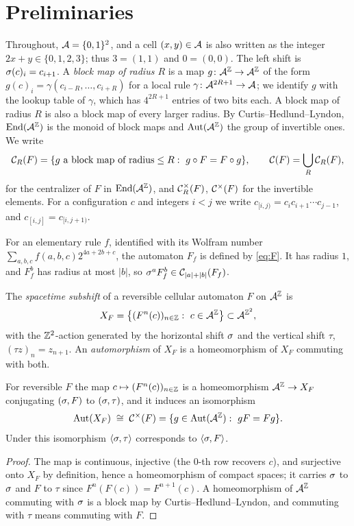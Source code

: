 \section{Preliminaries}\label{sec:prelim}

Throughout, $\mathcal{A}=\{0,1\}^2$, and a cell $(x,y)\in\mathcal{A}$ is also written as the integer $2x+y\in\{0,1,2,3\}$; thus $3=(1,1)$ and $0=(0,0)$. The left shift is $\sigma(c)_i=c_{i+1}$. A \emph{block map of radius $R$} is a map $g\colon\mathcal{A}^{\mathbb{Z}}\to\mathcal{A}^{\mathbb{Z}}$ of the form $g(c)_i=\gamma(c_{i-R},\dots,c_{i+R})$ for a local rule $\gamma\colon\mathcal{A}^{2R+1}\to\mathcal{A}$; we identify $g$ with the lookup table of $\gamma$, which has $4^{2R+1}$ entries of two bits each. A block map of radius $R$ is also a block map of every larger radius. By Curtis--Hedlund--Lyndon, $\operatorname{End}(\mathcal{A}^{\mathbb{Z}})$ is the monoid of block maps and $\operatorname{Aut}(\mathcal{A}^{\mathbb{Z}})$ the group of invertible ones. We write
\[
\Cent_R(F)=\{g\ \text{a block map of radius}\le R:\ g\circ F=F\circ g\},\qquad \Cent(F)=\bigcup_R\Cent_R(F),
\]
for the centralizer of $F$ in $\operatorname{End}(\mathcal{A}^{\mathbb{Z}})$, and $\mathcal{C}^{\times}_R(F)$, $\mathcal{C}^{\times}(F)$ for the invertible elements. For a configuration $c$ and integers $i<j$ we write $c_{[i,j)}=c_ic_{i+1}\cdots c_{j-1}$, and $c_{[i,j]}=c_{[i,j+1)}$.

For an elementary rule $f$, identified with its Wolfram number $\sum_{a,b,c}f(a,b,c)2^{4a+2b+c}$, the automaton $F_f$ is defined by \eqref{eq:F}. It has radius $1$, and $F_f^b$ has radius at most $|b|$, so $\sigma^aF_f^b\in\mathcal{C}_{|a|+|b|}(F_f)$.

\begin{definition}
The \emph{spacetime subshift} of a reversible cellular automaton $F$ on $\mathcal{A}^{\mathbb{Z}}$ is
\[
X_F=\bigl\{(F^n(c))_{n\in\Z}:\ c\in\A^{\Z}\bigr\}\subset\A^{\Z^2},
\]
with the $\mathbb{Z}^2$-action generated by the horizontal shift $\sigma$ and the vertical shift $\tau$, $(\tau z)_{n}=z_{n+1}$. An \emph{automorphism} of $X_F$ is a homeomorphism of $X_F$ commuting with both.
\end{definition}

\begin{lemma}\label{lem:spacetime}
For reversible $F$ the map $c\mapsto(F^n(c))_{n\in\mathbb{Z}}$ is a homeomorphism $\mathcal{A}^{\mathbb{Z}}\to X_F$ conjugating $(\sigma,F)$ to $(\sigma,\tau)$, and it induces an isomorphism
\[
\Aut(X_F)\;\cong\;\Cent^{\times}(F)=\{g\in\Aut(\A^{\Z}):\ gF=Fg\}.
\]
Under this isomorphism $\langle\sigma,\tau\rangle$ corresponds to $\langle\sigma,F\rangle$.
\end{lemma}

\begin{proof}
The map is continuous, injective (the $0$-th row recovers $c$), and surjective onto $X_F$ by definition, hence a homeomorphism of compact spaces; it carries $\sigma$ to $\sigma$ and $F$ to $\tau$ since $F^{n}(F(c))=F^{n+1}(c)$. A homeomorphism of $\mathcal{A}^{\mathbb{Z}}$ commuting with $\sigma$ is a block map by Curtis--Hedlund--Lyndon, and commuting with $\tau$ means commuting with $F$.
\end{proof}

